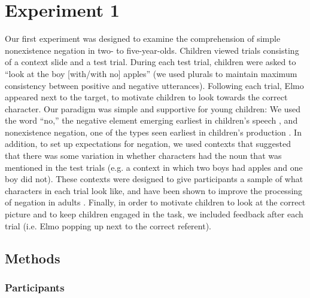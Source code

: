 \documentclass[man]{apa2}
\begin{document}
\section{Experiment 1}

Our first experiment was designed to examine the comprehension of simple nonexistence negation in two- to five-year-olds. Children viewed trials consisting of a context slide and a test trial.  During each test trial, children were asked to ``look at the boy [with/with no] apples'' (we used plurals to maintain maximum consistency between positive and negative utterances). Following each trial, Elmo appeared next to the target, to motivate children to look towards the correct character.  Our paradigm was simple  and supportive for young children: We used the word ``no,'' the negative element emerging earliest in children's speech \cite{klima1966, cameron2007}, and nonexistence negation, one of the types seen earliest in children's production \cite{bloom1970, bloom1993, pea1980}. In addition, to set up expectations for negation, we used contexts that suggested that there was some variation in whether characters had the noun that was mentioned in the test trials (e.g. a context in which two boys had apples and one boy did not).  These contexts were designed to give participants a sample of what characters in each trial look like, and have been shown to improve the processing of negation in adults \cite{nordmeyer2014}.  Finally, in order to motivate children to look at the correct picture and to keep children engaged in the task, we included feedback after each trial (i.e. Elmo popping up next to the correct referent).  

\subsection{Methods}
\subsubsection{Participants}
\end{document}
